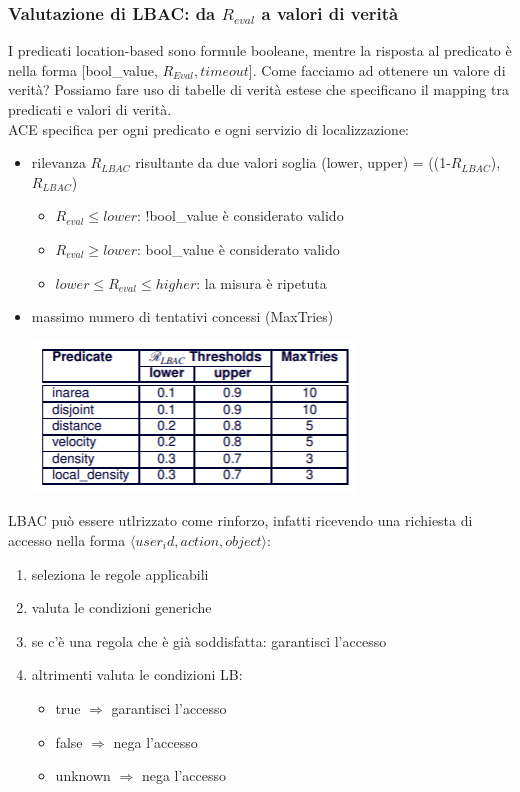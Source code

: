 \subsubsection{Valutazione di LBAC: da \(R_{eval}\) a valori di verità}
I predicati location-based sono formule booleane, mentre la risposta al predicato è nella forma [bool\_value, \(R_{Eval}, timeout\)]. Come facciamo ad ottenere un valore di verità? Possiamo fare uso di tabelle di verità estese che specificano il mapping tra predicati e valori di verità.\\
ACE specifica per ogni predicato e ogni servizio di localizzazione:
\begin{itemize}
    \item rilevanza \(R_{LBAC}\) risultante da due valori soglia (lower, upper) = ((1-\(R_{LBAC}\)), \(R_{LBAC}\))
    \begin{itemize}
        \item \(R_{eval} \leq lower\): !bool\_value è considerato valido
        \item \(R_{eval} \geq lower\): bool\_value è considerato valido
        \item \(lower \leq R_{eval} \leq higher\): la misura è ripetuta
    \end{itemize}
    \item massimo numero di tentativi concessi (MaxTries)
    \begin{center}
        \includegraphics[scale=0.8]{img/lbaceval.png}
    \end{center}
\end{itemize}
LBAC può essere utlrizzato come rinforzo, infatti ricevendo una richiesta di accesso nella forma \(\langle user_id, action, object \rangle\):
\begin{enumerate}
    \item seleziona le regole applicabili
    \item valuta le condizioni generiche
    \item se c'è una regola che è già soddisfatta: garantisci l'accesso
    \item altrimenti valuta le condizioni LB:
    \begin{itemize}
        \item true \(\Longrightarrow\) garantisci l'accesso
        \item false \(\Longrightarrow\) nega l'accesso
        \item unknown \(\Longrightarrow\) nega l'accesso
    \end{itemize}
\end{enumerate}

